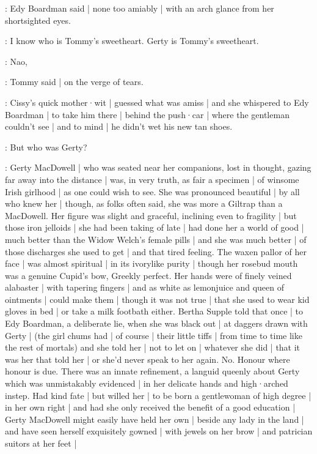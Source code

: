 :
Edy Boardman said |
none too amiably |
with an arch glance from her shortsighted eyes.

\edy:
I know who is Tommy's sweetheart.
Gerty is Tommy's sweetheart.

\tommy:
Nao,

:
Tommy said |
on the verge of tears.

:
Cissy's quick mother·wit |
guessed what was amiss |
and she whispered to Edy Boardman |
to take him there |
behind the push·car |
where the gentleman couldn't see |
and to mind |
he didn't wet his new tan shoes.

:
But who was Gerty?

:
Gerty MacDowell |
who was seated near her companions,
lost in thought,
gazing far away into the distance |
was,%
in very truth,
as fair a specimen |
of winsome Irish girlhood |
as one could wish to see.
She was pronounced beautiful |
by all who knew her |
though,
as folks often said,
she was more a Giltrap than a MacDowell.
Her figure was slight and graceful,
inclining even to fragility |
but those iron jelloids |
she had been taking of late |
had done her a world of good |
much better than the Widow Welch's female pills |
and she was much better |
of those discharges she used to get |
and that tired feeling.
The waxen pallor of her face |
was almost spiritual |
in its ivorylike purity |
though her rosebud mouth was a genuine Cupid's bow,
Greekly perfect.
Her hands were of finely veined alabaster |
with tapering fingers |
and
as white as lemonjuice
and queen of ointments |
could make them |
though it was not true |
that she used to wear kid gloves in bed |
or take a milk footbath either.
Bertha Supple told that once |
to Edy Boardman,
a deliberate lie,
when she was black out |
at daggers drawn with Gerty |
(the girl chums had |
of course |
their little tiffs |
from time to time
like the rest of mortals)
and she told her |
not to let on |
whatever she did |
that it was her that told her |
or she'd never speak to her again.
No.
Honour where honour is due.
There was an innate refinement,
a languid queenly  about Gerty
which was unmistakably evidenced |
in her delicate hands
and high·arched instep.
Had kind fate |
but willed her |
to be born a gentlewoman of high degree |
in her own right |%
and had she only received the benefit of a good education |
Gerty MacDowell might easily have held her own |
beside any lady in the land |
and have seen herself exquisitely gowned |
with jewels on her brow |
and patrician suitors at her feet |
